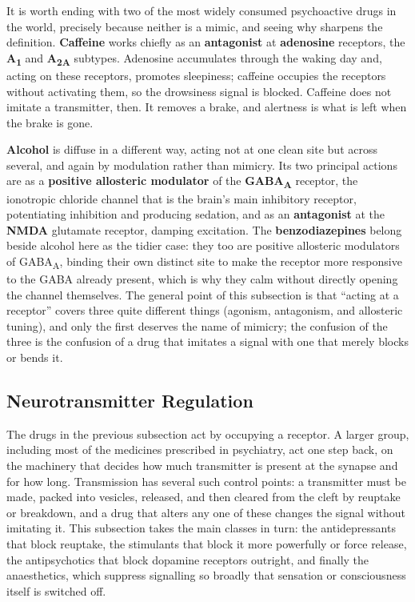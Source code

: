 \documentclass[11pt]{article}
\begin{document}
It is worth ending with two of the most widely consumed psychoactive drugs in the world, precisely because neither is a mimic, and seeing why sharpens the definition. \textbf{Caffeine} works chiefly as an \textbf{antagonist} at \textbf{adenosine} receptors, the \textbf{A\textsubscript{1}} and \textbf{A\textsubscript{2A}} subtypes. Adenosine accumulates through the waking day and, acting on these receptors, promotes sleepiness; caffeine occupies the receptors without activating them, so the drowsiness signal is blocked. Caffeine does not imitate a transmitter, then. It removes a brake, and alertness is what is left when the brake is gone.

\textbf{Alcohol} is diffuse in a different way, acting not at one clean site but across several, and again by modulation rather than mimicry. Its two principal actions are as a \textbf{positive allosteric modulator} of the \textbf{GABA\textsubscript{A}} receptor, the ionotropic chloride channel that is the brain's main inhibitory receptor, potentiating inhibition and producing sedation, and as an \textbf{antagonist} at the \textbf{NMDA} glutamate receptor, damping excitation. The \textbf{benzodiazepines} belong beside alcohol here as the tidier case: they too are positive allosteric modulators of GABA\textsubscript{A}, binding their own distinct site to make the receptor more responsive to the GABA already present, which is why they calm without directly opening the channel themselves. The general point of this subsection is that ``acting at a receptor'' covers three quite different things (agonism, antagonism, and allosteric tuning), and only the first deserves the name of mimicry; the confusion of the three is the confusion of a drug that imitates a signal with one that merely blocks or bends it.

\subsection{Neurotransmitter Regulation}

The drugs in the previous subsection act by occupying a receptor. A larger group, including most of the medicines prescribed in psychiatry, act one step back, on the machinery that decides how much transmitter is present at the synapse and for how long. Transmission has several such control points: a transmitter must be made, packed into vesicles, released, and then cleared from the cleft by reuptake or breakdown, and a drug that alters any one of these changes the signal without imitating it. This subsection takes the main classes in turn: the antidepressants that block reuptake, the stimulants that block it more powerfully or force release, the antipsychotics that block dopamine receptors outright, and finally the anaesthetics, which suppress signalling so broadly that sensation or consciousness itself is switched off.
\end{document}
